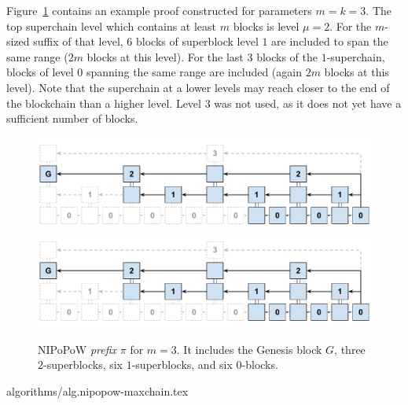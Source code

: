 Figure~\ref{fig.nipopow} contains an example proof constructed for parameters
$m = k = 3$. The top superchain level which contains at least $m$ blocks is
level $\mu = 2$. For the $m$-sized suffix of that level, $6$ blocks of
superblock level $1$ are included to span the same range ($2m$ blocks at this
level). For the last $3$ blocks of the $1$-superchain, blocks of level $0$
spanning the same range are included (again $2m$ blocks at this level). Note
that the superchain at a lower levels may reach closer to the end of the
blockchain than a higher level. Level $3$ was not used, as it does not yet have
a sufficient number of blocks.

\begin{figure}[h]
    \caption{
    NIPoPoW \emph{prefix} $\pi$ for $m = 3$. It includes the Genesis block $G$,
    three $2$-superblocks, six $1$-superblocks, and six $0$-blocks.
    }
    \centering
    \iftwocolumn
        \includegraphics[width=0.9\columnwidth,keepaspectratio]{figures/non-interactive-popow.pdf}
    \else
        \includegraphics[width=0.7\columnwidth,keepaspectratio]{figures/non-interactive-popow.pdf}
    \fi
    \label{fig.nipopow}
\end{figure}

{algorithms/alg.nipopow-maxchain.tex}


